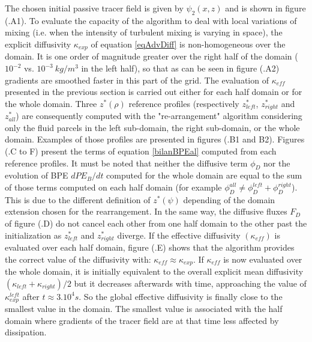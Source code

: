 The chosen initial passive tracer field is given by $\psi_2 (x,z)$ and is shown in figure (.A1).
To evaluate the capacity of the algorithm to deal with local variations of mixing (i.e. when the intensity of turbulent mixing is varying in space), the explicit diffusivity $\kappa_{exp}$ of equation \ref{eqAdvDiff} is non-homogeneous over the domain. It is one order of magnitude greater over the right half of the domain ($10^{-2}$ vs. $10^{-3} \ kg/m^3$ in the left half), so that as can be seen in figure (.A2) gradients are smoothed faster in this part of the grid.
The evaluation of $\kappa_{eff}$ presented in the previous section is carried out either for each half domain or for the whole domain. Three $z^*(\rho)$ reference profiles (respectively $z^*_{left}$, $z^*_{right}$ and $z^*_{all}$) are consequently computed with the "re-arrangement" algorithm considering only the fluid parcels in the left sub-domain, the right sub-domain, or the whole domain. Examples of those profiles are presented in figures (.B1 and B2).
Figures (.C to F) present the terms of equation \ref{bilanBPEal} computed from each reference profiles. It must be noted that neither the diffusive term $\phi_D$ nor the evolution of BPE $dPE_B/dt$ computed for the whole domain are equal to the sum of those terms computed on each half domain (for example $\phi_D^{all} \ne \phi_D^{left}+\phi_D^{right}$). This is due to the different definition of $z^*(\psi)$ depending of the domain extension chosen for the rearrangement. In the same way, the diffusive fluxes $F_D$ of figure (.D) do not cancel each other from one half domain to the other past the initialization as $z^*_{left}$ and $z^*_{right}$ diverge.
If the effective diffusivity $(\kappa_{eff})$ is evaluated over each half domain, figure (.E) shows that the algorithm provides the correct value of the diffusivity with: $\kappa_{eff}\approx\kappa_{exp}$. If $\kappa_{eff}$ is now evaluated over the whole domain, it is initially equivalent to the overall explicit mean diffusivity $(\kappa_{left}+\kappa_{right})/2$ but it decreases afterwards with time, approaching the value of $\kappa_{exp}^{left}$ after $t \approx 3.10^4s$. So the global effective diffusivity is finally close to the smallest value in the domain. The smallest value is associated with the half domain where gradients of the tracer field are at that time less affected by dissipation.
